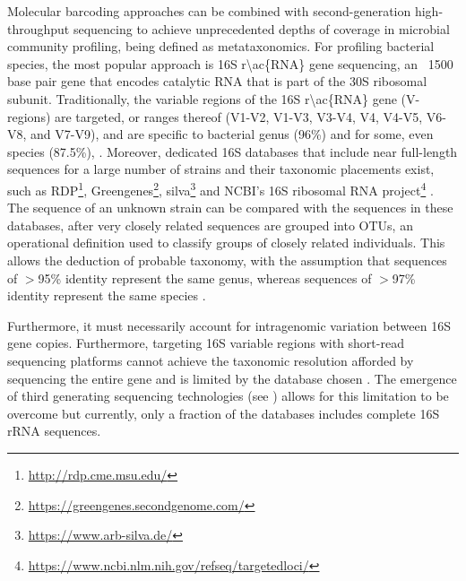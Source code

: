 Molecular barcoding approaches can be combined with second-generation high-throughput sequencing to achieve unprecedented depths of coverage in microbial community profiling, being defined as metataxonomics. 
For profiling bacterial species, the most popular approach is 16S \ac{r\ac{RNA}} gene sequencing, an ~1500 base pair gene that encodes catalytic \ac{RNA} that is part of the 30S ribosomal subunit. 
Traditionally, the variable regions of the 16S \ac{r\ac{RNA}} gene (V-regions) are targeted, or ranges thereof (V1-V2, V1-V3, V3-V4, V4, V4-V5, V6-V8, and V7-V9), and are specific to bacterial genus (96\%) and for some, even species (87.5\%), \citep{srinivasan_use_2015, abellan-schneyder_primer_2021}. 
Moreover, dedicated 16S databases that include near full-length sequences for a large number of strains and their taxonomic placements exist, such as RDP\footnote{\url{http://rdp.cme.msu.edu/}}, Greengenes\footnote{\url{https://greengenes.secondgenome.com/}}, silva\footnote{\url{https://www.arb-silva.de/}} and NCBI's 16S ribosomal \ac{RNA} project\footnote{\url{https://www.ncbi.nlm.nih.gov/refseq/targetedloci/}} \citep{cole_ribosomal_2009, desantis_greengenes_2006, pruesse_silva_2007}. 
The sequence of an unknown strain can be compared with the sequences in these databases, after very closely related sequences are grouped into \ac{OTUs},  an operational definition used to classify groups of closely related individuals. This allows the deduction of probable taxonomy, with the assumption that sequences of $>$95\% identity represent the same genus, whereas sequences of $>$97\% identity represent the same species \citep{schloss_introducing_2005}. 

Furthermore, it must necessarily account for intragenomic variation between 16S gene copies. 
Furthermore, targeting 16S variable regions with short-read sequencing platforms cannot achieve the taxonomic resolution afforded by sequencing the entire gene and is limited by the database chosen \citep{johnson_evaluation_2019}. 
The emergence of third generating sequencing technologies (see ) allows for this limitation to be overcome but currently, only a fraction of the databases includes complete 16S \ac{rRNA} sequences.

